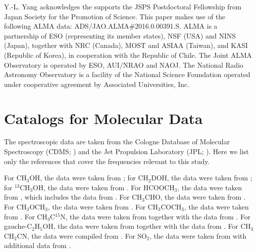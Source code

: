 \documentclass[twocolumn]{aastex62}
\newcommand{\methylformate}{\mbox{HCOOCH$_{3}$}}
\newcommand{\methanol}{\mbox{CH$_{3}$OH}}
\newcommand{\tmethanol}{\mbox{$^{13}$CH$_{3}$OH}}
\newcommand{\dmethanol}{\mbox{CH$_{2}$DOH}}
\newcommand{\dimethylether}{\mbox{CH$_{3}$OCH$_{3}$}}
\newcommand{\acetone}{\mbox{CH$_{3}$COCH$_{3}$}}
\newcommand{\ethanol}{\mbox{C$_{2}$H$_{5}$OH}}
\newcommand{\acetaldehyde}{\mbox{CH$_{3}$CHO}}
\newcommand{\ethylcyanide}{\mbox{CH$_{3}$CH$_{2}$CN}}
\begin{document}
\acknowledgements
Y.-L. Yang acknowledges the supports the JSPS Postdoctoral Fellowship from Japan Society for the Promotion of Science.  This paper makes use of the following ALMA data: ADS/JAO.ALMA\#2016.0.00391.S. ALMA is a partnership of ESO (representing its member states), NSF (USA) and NINS (Japan), together with NRC (Canada), MOST and ASIAA (Taiwan), and KASI (Republic of Korea), in cooperation with the Republic of Chile. The Joint ALMA Observatory is operated by ESO, AUI/NRAO and NAOJ.  The National Radio Astronomy Observatory is a facility of the National Science Foundation operated under cooperative agreement by Associated Universities, Inc.



\appendix
\section{Catalogs for Molecular Data}
\label{sec:catalogs}
The spectroscopic data are taken from the Cologne Database of Molecular Spectroscopy (CDMS; \citealt{2001A&A...370L..49M,2005JMoSt.742..215M,2016JMoSp.327...95E}) and the Jet Propulsion Laboratory (JPL; \citealt{1998JQSRT..60..883P}).  Here we list only the references that cover the frequencies relevant to this study.  

For \methanol, the data were taken from \citet{2008JMoSp.251..305X}; for \dmethanol, the data were taken from \citet{2012JMoSp.280..119P}; for \tmethanol, the data were taken from \citet{1997JPCRD..26...17X}.  For \methylformate, the data were taken from \citet{2009JMoSp.255...32I}, which includes the data from \citet{1984ApJS...55..633P,1999ApJ...521..255O,2007JMoSp.246..158C,2008JMoSp.251..293M}.  For \acetaldehyde, the data were taken from \citet{1996JPCRD..25.1113K}.  For \dimethylether, the data were taken from \citet{2009A&A...504..635E}.  For \acetone, the data were taken from \citet{2002ApJS..142..145G}.  For CH$_{3}$C$^{15}$N, the data were taken from \citet{2009A&A...506.1487M} together with the data from \citet{1996ApJ...471.1067P}.  For gauche-\ethanol, the data were taken from \citet{2008JMoSp.251..394P} together with the data from \citet{1996JMoSp.175..246P}.  For \ethylcyanide, the data were compiled from \citet{1994ApJS...93..589P,2009ApJS..184..133B}.  For SO$_{2}$, the data were taken from \citet{2005JMoSp.232..213M} with additional data from \citet{1985JPCRD..14..395L,1985JMoSp.111...66H,1998JMoSp.191...17B}.
\end{document}
